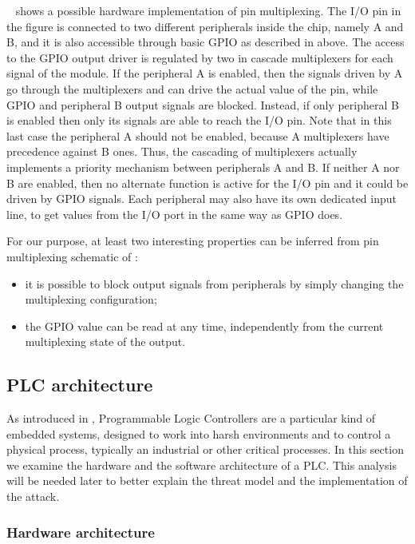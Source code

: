 ~ shows a possible hardware implementation of pin multiplexing.
The I/O pin in the figure is connected to two different peripherals inside the chip, namely A and B,
and it is also accessible through basic GPIO as described in  above.
The access to the GPIO output driver is regulated by two in cascade multiplexers for each signal of the module.
If the peripheral A is enabled, then the signals driven by A go through the multiplexers and can drive the actual value of the pin,
while GPIO and peripheral B output signals are blocked. Instead, if only peripheral B is enabled then only its signals are able to reach the I/O pin.
Note that in this last case the peripheral A should not be enabled, because A multiplexers have precedence against B ones.
Thus, the cascading of multiplexers actually implements a priority mechanism between peripherals A and B.
If neither A nor B are enabled, then no alternate function is active for the I/O pin and it could be driven by GPIO signals.
Each peripheral may also have its own dedicated input line, to get values from the I/O port in the same way as GPIO does.

For our purpose, at least two interesting properties can be inferred from pin multiplexing schematic of :
\begin{itemize}
	\item it is possible to block output signals from peripherals by simply changing the multiplexing configuration;
	\item the GPIO value can be read at any time, independently from the current multiplexing state of the output.
\end{itemize}


\subsection{PLC architecture}
\label{sec:plc-arch}

As introduced in , Programmable Logic Controllers are a particular kind of embedded systems,
designed to work into harsh environments and to control a physical process, typically an industrial or other critical processes.
In this section we examine the hardware and the software architecture of a PLC. This analysis will be needed later to better explain
the threat model and the implementation of the attack.


\subsubsection{Hardware architecture}

